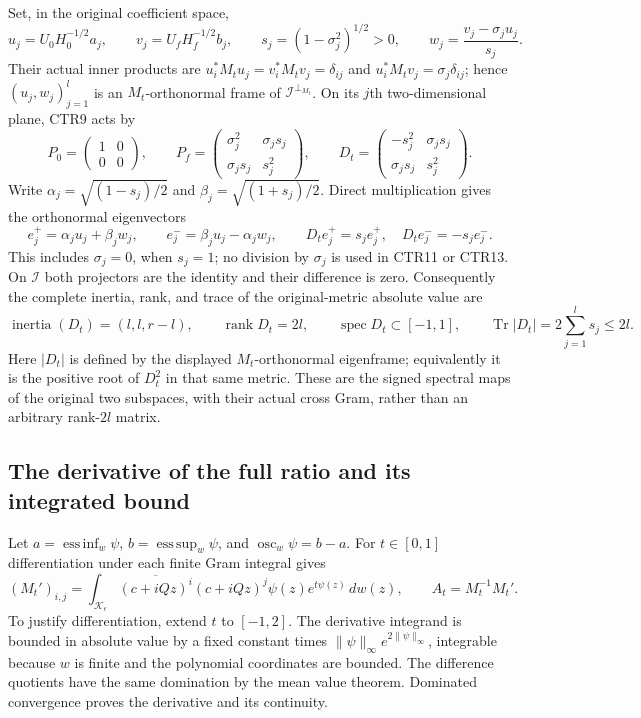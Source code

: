 \documentclass[11pt,a4paper]{article}
\begin{document}
Set, in the original coefficient space,
\[
 u_j=U_0H_0^{-1/2}a_j,\qquad v_j=U_fH_f^{-1/2}b_j,\qquad
 s_j=(1-\sigma_j^2)^{1/2}>0,\qquad
 w_j=\frac{v_j-\sigma_ju_j}{s_j}.
 \tag{CTR11}
\]
Their actual inner products are
$u_i^*M_tu_j=v_i^*M_tv_j=\delta_{ij}$ and
$u_i^*M_tv_j=\sigma_j\delta_{ij}$; hence $(u_j,w_j)_{j=1}^l$ is an
$M_t$-orthonormal frame of $\mathcal I^{\perp_{M_t}}$.
On its $j$th two-dimensional plane, CTR9 acts by
\[
 P_0=\begin{pmatrix}1&0\\0&0\end{pmatrix},\qquad
 P_f=\begin{pmatrix}\sigma_j^2&\sigma_js_j\\\sigma_js_j&s_j^2\end{pmatrix},\qquad
 D_t=\begin{pmatrix}-s_j^2&\sigma_js_j\\\sigma_js_j&s_j^2\end{pmatrix}.
 \tag{CTR12}
\]
Write $\alpha_j=\sqrt{(1-s_j)/2}$ and
$\beta_j=\sqrt{(1+s_j)/2}$. Direct multiplication gives the orthonormal
eigenvectors
\[
 e_j^+=\alpha_ju_j+\beta_jw_j,\qquad
 e_j^-=\beta_ju_j-\alpha_jw_j,\qquad
 D_te_j^+=s_je_j^+,\quad D_te_j^-=-s_je_j^-.
 \tag{CTR13}
\]
This includes $\sigma_j=0$, when $s_j=1$; no division by $\sigma_j$
is used in CTR11 or CTR13. On $\mathcal I$ both projectors are the
identity and their difference is zero. Consequently the complete inertia,
rank, and trace of the original-metric absolute value are
\[
 \operatorname{inertia}(D_t)=(l,l,r-l),\qquad
 \operatorname{rank}D_t=2l,\qquad
 \operatorname{spec}D_t\subset[-1,1],\qquad
 \operatorname{Tr}|D_t|=2\sum_{j=1}^l s_j\leq2l.
 \tag{CTR14}
\]
Here $|D_t|$ is defined by the displayed $M_t$-orthonormal eigenframe;
equivalently it is the positive root of $D_t^2$ in that same metric.
These are the signed spectral maps of the original two subspaces,
with their actual cross Gram, rather than an arbitrary rank-$2l$ matrix.

\subsection{The derivative of the full ratio and its integrated bound}
Let $a=\operatorname*{ess\,inf}_w\psi$,
$b=\operatorname*{ess\,sup}_w\psi$, and $\operatorname{osc}_w\psi=b-a$.
For $t\in[0,1]$ differentiation under each finite Gram integral gives
\[
 (M_t')_{i,j}=\int_{\mathcal K_\epsilon}
       \overline{(c+iQz)^i}(c+iQz)^j\psi(z)e^{t\psi(z)}\,dw(z),\qquad
 A_t=M_t^{-1}M_t'.
 \tag{CTR15}
\]
To justify differentiation, extend $t$ to $[-1,2]$. The derivative
integrand is bounded in absolute value by a fixed constant times
$\|\psi\|_\infty e^{2\|\psi\|_\infty}$, integrable because $w$ is
finite and the polynomial coordinates are bounded. The difference
quotients have the same domination by the mean value theorem.
Dominated convergence proves the derivative and its continuity.
\end{document}
